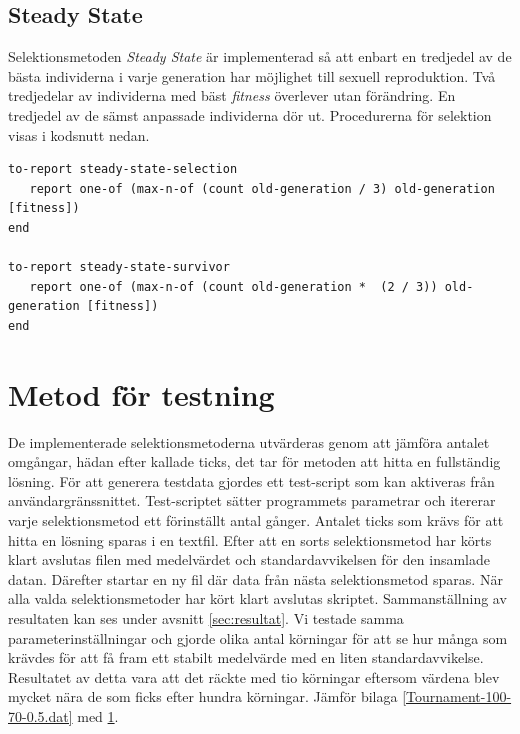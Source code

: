 \documentclass[titlepage, a4paper, 12pt]{article}
\begin{document}
\subsection{Steady State}
Selektionsmetoden \textit{Steady State} är implementerad så att enbart
en tredjedel av de bästa individerna i varje generation har möjlighet
till sexuell reproduktion. Två tredjedelar av individerna med bäst
\textit{fitness} överlever utan förändring. En tredjedel av de sämst
anpassade individerna dör ut. Procedurerna för selektion visas i
kodsnutt nedan.

\begin{kod}[H]
  \begin{scriptsize}
\begin{verbatim}
to-report steady-state-selection
   report one-of (max-n-of (count old-generation / 3) old-generation [fitness])
end

to-report steady-state-survivor
   report one-of (max-n-of (count old-generation *  (2 / 3)) old-generation [fitness])
end
\end{verbatim}
  \end{scriptsize}
\end{kod}

\section{Metod för testning}
De implementerade selektionsmetoderna utvärderas genom att jämföra
antalet omgångar, hädan efter kallade ticks, det tar för metoden att
hitta en fullständig lösning. För att generera testdata gjordes ett
test-script som kan aktiveras från användargränssnittet. Test-scriptet
sätter programmets parametrar och itererar varje selektionsmetod ett
förinställt antal gånger. Antalet ticks som krävs för att hitta en
lösning sparas i en textfil. Efter att en sorts selektionsmetod har
körts klart avslutas filen med medelvärdet och standardavvikelsen för
den insamlade datan. Därefter startar en ny fil där data från nästa
selektionsmetod sparas. När alla valda selektionsmetoder har kört
klart avslutas skriptet. Sammanställning av resultaten kan ses under
avsnitt \ref{sec:resultat}. Vi testade samma parameterinställningar
och gjorde olika antal körningar för att se hur många som krävdes för
att få fram ett stabilt medelvärde med en liten
standardavvikelse. Resultatet av detta vara att det räckte med tio
körningar eftersom värdena blev mycket nära de som ficks efter hundra
körningar. Jämför bilaga \ref{Tournament-100-70-0.5.dat} med \ref{}.
\end{document}
